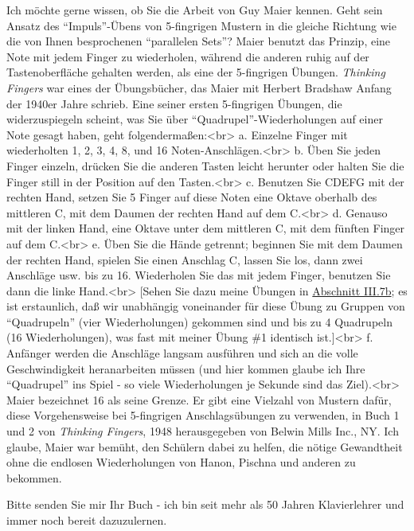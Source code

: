 \item \hypertarget{testimonials04}{}
Ich möchte gerne wissen, ob Sie die Arbeit von Guy Maier kennen.
Geht sein Ansatz des \enquote{Impuls}-Übens von 5-fingrigen Mustern in die gleiche Richtung wie die von Ihnen besprochenen \enquote{parallelen Sets}?
Maier benutzt das Prinzip, eine Note mit jedem Finger zu wiederholen, während die anderen ruhig auf der Tastenoberfläche gehalten werden, als eine der 5-fingrigen Übungen.
\textit{Thinking Fingers} war eines der Übungsbücher, das Maier mit Herbert Bradshaw Anfang der 1940er Jahre schrieb.
Eine seiner ersten 5-fingrigen Übungen, die widerzuspiegeln scheint, was Sie über \enquote{Quadrupel}-Wiederholungen auf einer Note gesagt haben, geht folgendermaßen:<br>
a. Einzelne Finger mit wiederholten 1, 2, 3, 4, 8, und 16 Noten-Anschlägen.<br>
b. Üben Sie jeden Finger einzeln, drücken Sie die anderen Tasten leicht herunter oder halten Sie die Finger still in der Position auf den Tasten.<br>
c. Benutzen Sie CDEFG mit der rechten Hand, setzen Sie 5 Finger auf diese Noten eine Oktave oberhalb des mittleren C, mit dem Daumen der rechten Hand auf dem C.<br>
d. Genauso mit der linken Hand, eine Oktave unter dem mittleren C, mit dem fünften Finger auf dem C.<br>
e. Üben Sie die Hände getrennt; beginnen Sie mit dem Daumen der rechten Hand, spielen Sie einen Anschlag C, lassen Sie los, dann zwei Anschläge usw. bis zu 16.
Wiederholen Sie das mit jedem Finger, benutzen Sie dann die linke Hand.<br>
[Sehen Sie dazu meine Übungen in \hyperlink{c1iii7b}{Abschnitt III.7b}; es ist erstaunlich, daß wir unabhängig voneinander für diese Übung zu Gruppen von \enquote{Quadrupeln} (vier Wiederholungen) gekommen sind und bis zu 4 Quadrupeln (16 Wiederholungen), was fast mit meiner Übung \#1 identisch ist.]<br>
f. Anfänger werden die Anschläge langsam ausführen und sich an die volle Geschwindigkeit heranarbeiten müssen (und hier kommen glaube ich Ihre \enquote{Quadrupel} ins Spiel - so viele Wiederholungen je Sekunde sind das Ziel).<br> Maier bezeichnet 16 als seine Grenze.
Er gibt eine Vielzahl von Mustern dafür, diese Vorgehensweise bei 5-fingrigen Anschlagsübungen zu verwenden, in Buch 1 und 2 von \textit{Thinking Fingers}, 1948 herausgegeben von Belwin Mills Inc., NY.
Ich glaube, Maier war bemüht, den Schülern dabei zu helfen, die nötige Gewandtheit ohne die endlosen Wiederholungen von Hanon, Pischna und anderen zu bekommen.


\item \hypertarget{testimonials05}{}
Bitte senden Sie mir Ihr Buch - ich bin seit mehr als 50 Jahren Klavierlehrer und immer noch bereit dazuzulernen.



